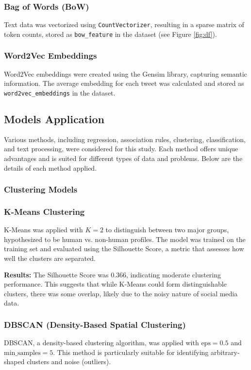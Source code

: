 \documentclass[a4paper,11pt]{article}
\begin{document}
\subsubsection*{Bag of Words (BoW)}
Text data was vectorized using \texttt{CountVectorizer}, resulting in a sparse matrix of token counts, stored as \texttt{bow\_feature} in the dataset (see Figure \ref{fig:df}).

\subsubsection*{Word2Vec Embeddings}
Word2Vec embeddings were created using the Gensim library, capturing semantic information. The average embedding for each tweet was calculated and stored as \texttt{word2vec\_embeddings} in the dataset.

\subsection{Models Application}

Various methods, including regression, association rules, clustering, classification, and text processing, were considered for this study. Each method offers unique advantages and is suited for different types of data and problems. Below are the details of each method applied.

\subsubsection*{Clustering Models}

\subsubsection*{K-Means Clustering}
K-Means was applied with \( K=2 \) to distinguish between two major groups, hypothesized to be human vs. non-human profiles. The model was trained on the training set and evaluated using the Silhouette Score, a metric that assesses how well the clusters are separated.

\textbf{Results:} The Silhouette Score was 0.366, indicating moderate clustering performance. This suggests that while K-Means could form distinguishable clusters, there was some overlap, likely due to the noisy nature of social media data.

\subsubsection*{DBSCAN (Density-Based Spatial Clustering)}
DBSCAN, a density-based clustering algorithm, was applied with \( \text{eps}=0.5 \) and \( \text{min\_samples}=5 \). This method is particularly suitable for identifying arbitrary-shaped clusters and noise (outliers).
\end{document}
